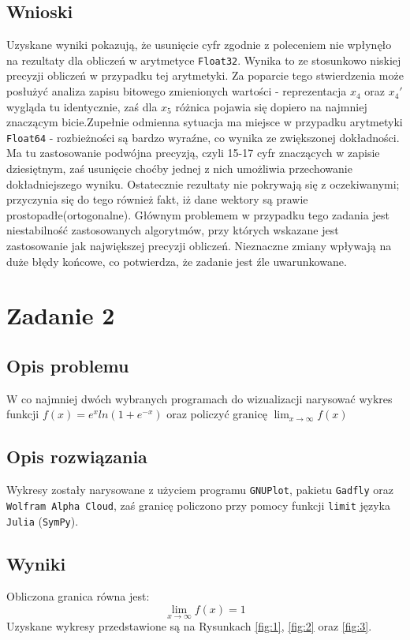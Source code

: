 \documentclass{classrep}
\begin{document}
	\subsection{Wnioski}
		Uzyskane wyniki pokazują, że usunięcie cyfr zgodnie z poleceniem nie wpłynęło na rezultaty dla obliczeń w arytmetyce \texttt{Float32}. 
		Wynika to ze stosunkowo niskiej precyzji obliczeń w przypadku tej arytmetyki. Za poparcie tego stwierdzenia może posłużyć analiza zapisu bitowego zmienionych wartości - reprezentacja $x_4$ oraz $x_4'$ wygląda tu identycznie, zaś dla $x_5$ różnica pojawia się dopiero na najmniej znaczącym bicie.Zupełnie odmienna sytuacja ma miejsce w przypadku arytmetyki \texttt{Float64} - rozbieżności są bardzo wyraźne, co wynika ze zwiększonej dokładności. Ma tu zastosowanie podwójna precyzją, czyli 15-17 cyfr znaczących w zapisie dziesiętnym, zaś usunięcie choćby jednej z nich umożliwia przechowanie dokładniejszego wyniku. Ostatecznie rezultaty nie pokrywają się z oczekiwanymi; przyczynia się do tego również fakt, iż dane wektory są prawie prostopadłe(ortogonalne). Głównym problemem w przypadku tego zadania jest niestabilność zastosowanych algorytmów, przy których wskazane jest zastosowanie jak największej precyzji obliczeń. Nieznaczne zmiany wpływają na duże błędy końcowe, co potwierdza, że zadanie jest źle uwarunkowane.
\section{Zadanie 2}
	\subsection{Opis problemu}
		W co najmniej dwóch wybranych programach do wizualizacji narysować wykres funkcji $f(x)=e^{x}ln(1+e^{-x})$ oraz policzyć granicę $\lim_{x \to \infty} f(x)$
		
	\subsection{Opis rozwiązania}
		Wykresy zostały narysowane z użyciem programu \texttt{GNUPlot}, pakietu \texttt{Gadfly} oraz \texttt{Wolfram Alpha Cloud}, zaś granicę policzono przy pomocy funkcji \texttt{limit} języka \texttt{Julia} (\texttt{SymPy}).
	\subsection{Wyniki}
		Obliczona granica równa jest: $$\lim_{x \to \infty} f(x) = 1$$	
		Uzyskane wykresy przedstawione są na Rysunkach \ref{fig:1}, \ref{fig:2} oraz \ref{fig:3}.
		
\end{document}
